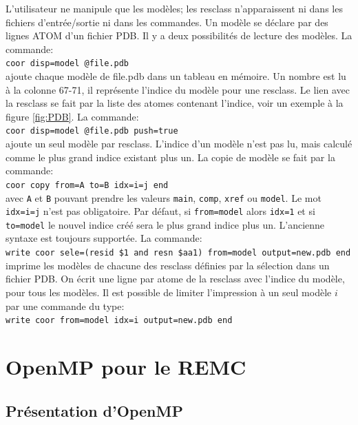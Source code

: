 L'utilisateur ne manipule que les modèles; les resclass n'apparaissent ni dans les fichiers d'entrée/sortie ni dans les commandes. Un modèle se déclare par des lignes ATOM d'un fichier PDB. Il y a deux possibilités de lecture des modèles. La commande:\\
\verb!coor disp=model @file.pdb!\\
ajoute chaque modèle de file.pdb dans un tableau en mémoire. Un nombre est lu à la colonne 67-71, il représente l'indice du modèle pour une resclass. Le lien avec la resclass se fait par la liste des atomes contenant l'indice, voir un exemple à la figure \ref{fig:PDB}. La commande:\\
\verb!coor disp=model @file.pdb push=true!\\
ajoute un seul modèle par resclass. L'indice d'un modèle n'est pas lu, mais calculé comme le plus grand indice existant plus un. 
La copie de modèle se fait par la commande:\\
\verb!coor copy from=A to=B idx=i=j end!\\
avec \verb!A! et \verb!B!  pouvant prendre les valeurs \verb!main!, \verb!comp!, \verb!xref! ou \verb!model!.
Le mot \verb!idx=i=j! n'est pas obligatoire. Par défaut, si \verb!from=model! alors \verb!idx=1! et si \verb!to=model! le nouvel indice créé sera le plus grand indice plus un. L'ancienne syntaxe est toujours supportée. La commande:\\ 
\verb!write coor sele=(resid $1 and resn $aa1) from=model output=new.pdb end!\\
imprime les modèles de chacune des resclass définies par la sélection dans un fichier PDB. On écrit une ligne par atome de la resclass avec l'indice du modèle, pour tous les modèles. 
Il est possible de limiter l'impression à un seul modèle $i$ par une commande du type:\\
\verb!write coor from=model idx=i output=new.pdb end!\\

\section{OpenMP pour le REMC}
\subsection{Présentation d'OpenMP}

